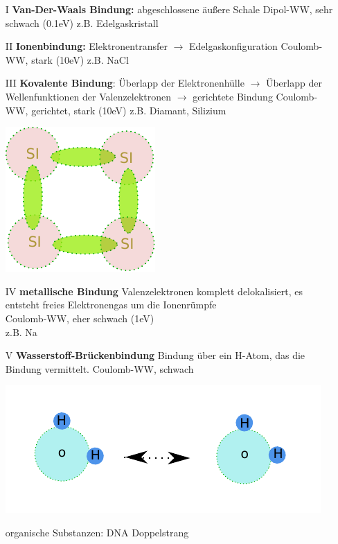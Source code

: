 	\begin{itemize}
		\item[I] \textbf{Van-Der-Waals Bindung:}\newline
			abgeschlossene äußere Schale \newline
			Dipol-WW, sehr schwach (0.1eV)\newline
			z.B. Edelgaskristall
		\item[II] \textbf{Ionenbindung:} \newline
			Elektronentransfer $\rightarrow$ Edelgaskonfiguration \newline
			Coulomb-WW, stark (10eV) \newline
			z.B. NaCl
		\item[III] \textbf{Kovalente Bindung}:\newline
			Überlapp der Elektronenhülle $\rightarrow$  Überlapp der Wellenfunktionen der Valenzelektronen\newline
			$\rightarrow$ gerichtete Bindung \newline
			Coulomb-WW, gerichtet, stark (10eV)\newline
			z.B. Diamant, Silizium
			\begin{center}
				\includegraphics{figures/1_1silizium.pdf}
			\end{center}
		\item[IV] \textbf{metallische Bindung}\newline
			Valenzelektronen komplett delokalisiert, es entsteht \glqq freies Elektronengas\grqq{}
			um die Ionenrümpfe \\
			Coulomb-WW, eher schwach (1eV)\\
			z.B. Na
		\item[V] \textbf{Wasserstoff-Brückenbindung}\newline
			Bindung über ein H-Atom, das die Bindung vermittelt.\newline
			Coulomb-WW, schwach
			\begin{center}
				\includegraphics{figures/1_1wasserstoff.pdf}
			\end{center}
			organische Substanzen: DNA Doppelstrang
	\end{itemize}

